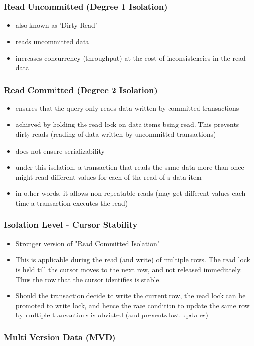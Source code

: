 \documentclass[12]{beamer}
\begin{document}
\begin{frame}
\frametitle{Read Uncommitted (Degree 1 Isolation)}
\begin{itemize}
\item also known as 'Dirty Read'
\item reads uncommitted data
\item increases concurrency (throughput) at the cost of inconsistencies in the read data
\end{itemize}
\end{frame}

\begin{frame}
\frametitle{Read Committed (Degree 2 Isolation)}
\begin{itemize}
\item ensures that the query only reads data written by committed transactions
\item achieved by holding the read lock on data items being read. This prevents dirty reads (reading of data written by uncommitted transactions)
\item does not ensure serializability
\item under this isolation, a transaction that reads the same data more than once might read different values for each of the read of a data item
\item in other words, it allows non-repeatable reads (may get different values each time a transaction executes the read)
\end{itemize}
\end{frame}

\begin{frame}
\frametitle{Isolation Level - Cursor Stability}
\begin{itemize}
\item Stronger version of "Read Committed Isolation"
\item This is applicable during the read (and write) of multiple rows. The read lock is held till the cursor moves to the next row, and not released immediately. Thus the row that the cursor identifies is stable.
\item Should the transaction decide to write the current row, the read lock can be promoted to write lock, and hence the race condition to update the same row by multiple transactions is obviated (and prevents lost updates)
\end{itemize}
\end{frame}

\subsubsection{Multi Version Data (MVD)}
\end{document}
